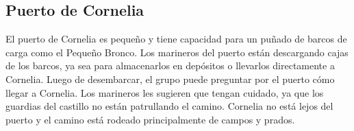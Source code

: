 \subsection*{Puerto de Cornelia}
El puerto de Cornelia es pequeño y tiene capacidad para un puñado de barcos de carga como el Pequeño Bronco. Los marineros del puerto están descargando cajas de los barcos, ya sea para almacenarlos en depósitos o llevarlos directamente a Cornelia. Luego de desembarcar, el grupo puede preguntar por el puerto cómo llegar a Cornelia. Los marineros les sugieren que tengan cuidado, ya que los guardias del castillo no están patrullando el camino. Cornelia no está lejos del puerto y el camino está rodeado principalmente de campos y prados.
%
\vfill
{}
%
